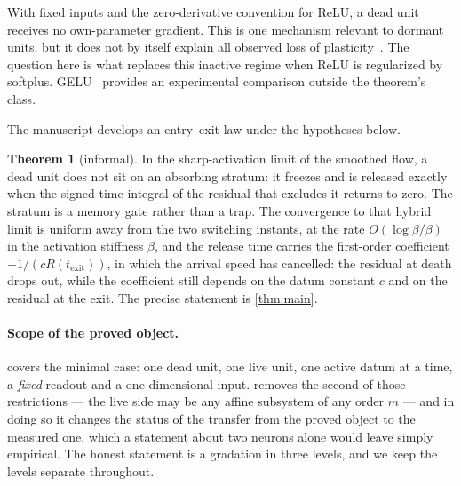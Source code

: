 \documentclass[11pt]{article}
\theoremstyle{definition}
\newtheorem*{theorem*}{Theorem}
\theoremstyle{remark}
\newcommand{\texit}{t_{\mathrm{exit}}}
\begin{document}
With fixed inputs and the zero-derivative convention for ReLU, a dead unit
receives no own-parameter gradient. This is one mechanism relevant to dormant
units, but it does not by itself explain all observed loss of
plasticity~\cite{Sokar23,Lyle23,Dohare24}. The question here is what replaces
this inactive regime when ReLU is regularized by softplus. GELU~\cite{HG16}
provides an experimental comparison outside the theorem's class.

The manuscript develops an entry--exit law under the hypotheses below.

\begin{theorem*}[informal]
In the sharp-activation limit of the smoothed flow, a dead unit does not sit on
an absorbing stratum: it freezes and is released exactly when the signed time
integral of the residual that excludes it returns to zero. The stratum is a
memory gate rather than a trap. The convergence to that hybrid limit is uniform
away from the two switching instants, at the rate $O(\log\beta/\beta)$ in the
activation stiffness $\beta$, and the release time carries the first-order
coefficient $-1/(cR(\texit))$, in which the arrival speed has cancelled: the
residual at death drops out, while the coefficient still depends on the datum
constant $c$ and on the residual at the exit. The precise statement is
\cref{thm:main}.
\end{theorem*}

\paragraph{Scope of the proved object.}  covers the minimal
case: one dead unit, one live unit, one active datum at a time, a \emph{fixed}
readout and a one-dimensional input.  removes the second of
those restrictions --- the live side may be any affine subsystem of any order
$m$ --- and in doing so it changes the status of the transfer from the proved
object to the measured one, which a statement about two neurons alone would
leave simply empirical. The honest statement is a gradation in three levels, and
we keep the levels separate throughout.
\end{document}
